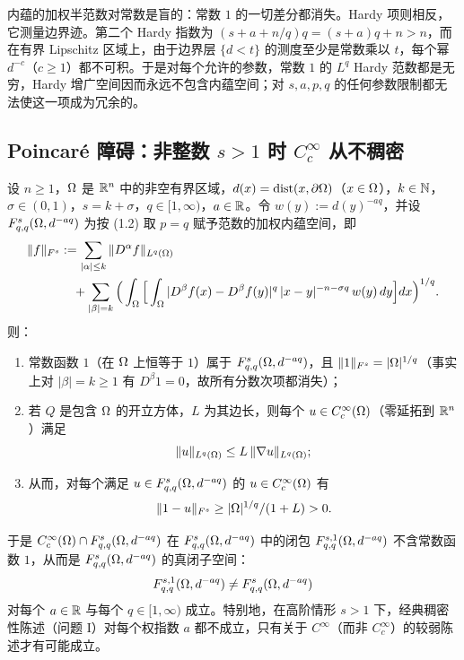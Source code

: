 \begin{remark}[直觉]
内蕴的加权半范数对常数是盲的：常数 $1$ 的一切差分都消失。Hardy 项则相反，它测量边界迹。第二个 Hardy 指数为 $(s+a+n/q)q=(s+a)q+n>n$，而在有界 Lipschitz 区域上，由于边界层 $\{d<t\}$ 的测度至少是常数乘以 $t$，每个幂 $d^{-c}$（$c\ge1$）都不可积。于是对每个允许的参数，常数 $1$ 的 $L^q$ Hardy 范数都是无穷，Hardy 增广空间因而永远不包含内蕴空间；对 $s,a,p,q$ 的任何参数限制都无法使这一项成为冗余的。
\end{remark}

\subsection{Poincar\'e 障碍：非整数 \texorpdfstring{$s>1$}{s>1} 时 \texorpdfstring{$C_c^\infty$}{Cc-infinity} 从不稠密}

\begin{theorem}
设 $n\ge1$，$\Omega$ 是 $\mathbb{R}^n$ 中的非空有界区域，$d(x)=\operatorname{dist}(x,\partial\Omega)$（$x\in\Omega$），$k\in\mathbb{N}$，$\sigma\in(0,1)$，$s=k+\sigma$，$q\in[1,\infty)$，$a\in\mathbb{R}$。令 $w(y):=d(y)^{-aq}$，并设 $F^{s}_{q,q}(\Omega,d^{-aq})$ 为按 (1.2) 取 $p=q$ 赋予范数的加权内蕴空间，即
\begin{equation}\label{eq:sec6-f3-norm}
  \begin{split}
    \|f\|_{F^s}
    &:=\sum_{|\alpha|\le k}\|D^\alpha f\|_{L^q(\Omega)}\\
    &\quad+\sum_{|\beta|=k}\Big(\int_\Omega\Big[\int_\Omega|D^\beta f(x)-D^\beta f(y)|^q\,|x-y|^{-n-\sigma q}\,w(y)\,dy\Big]dx\Big)^{1/q}.
  \end{split}
\end{equation}
则：
\begin{enumerate}[label=(\roman*)]
  \item 常数函数 $1$（在 $\Omega$ 上恒等于 $1$）属于 $F^{s}_{q,q}(\Omega,d^{-aq})$，且 $\|1\|_{F^s}=|\Omega|^{1/q}$（事实上对 $|\beta|=k\ge1$ 有 $D^\beta 1=0$，故所有分数次项都消失）；
  \item 若 $Q$ 是包含 $\Omega$ 的开立方体，$L$ 为其边长，则每个 $u\in C_c^\infty(\Omega)$（零延拓到 $\mathbb{R}^n$）满足
  \[
    \|u\|_{L^q(\Omega)}\le L\,\|\nabla u\|_{L^q(\Omega)};
  \]
  \item 从而，对每个满足 $u\in F^{s}_{q,q}(\Omega,d^{-aq})$ 的 $u\in C_c^\infty(\Omega)$ 有
  \[
    \|1-u\|_{F^s}\ge|\Omega|^{1/q}/(1+L)>0.
  \]
\end{enumerate}
于是 $C_c^\infty(\Omega)\cap F^{s}_{q,q}(\Omega,d^{-aq})$ 在 $F^{s}_{q,q}(\Omega,d^{-aq})$ 中的闭包 $F^{s,1}_{q,q}(\Omega,d^{-aq})$ 不含常数函数 $1$，从而是 $F^{s}_{q,q}(\Omega,d^{-aq})$ 的真闭子空间：
\[
  F^{s,1}_{q,q}(\Omega,d^{-aq})\ne F^{s}_{q,q}(\Omega,d^{-aq})
\]
对每个 $a\in\mathbb{R}$ 与每个 $q\in[1,\infty)$ 成立。特别地，在高阶情形 $s>1$ 下，经典稠密性陈述（问题 I）对每个权指数 $a$ 都不成立，只有关于 $C^\infty$（而非 $C_c^\infty$）的较弱陈述才有可能成立。
\end{theorem}

